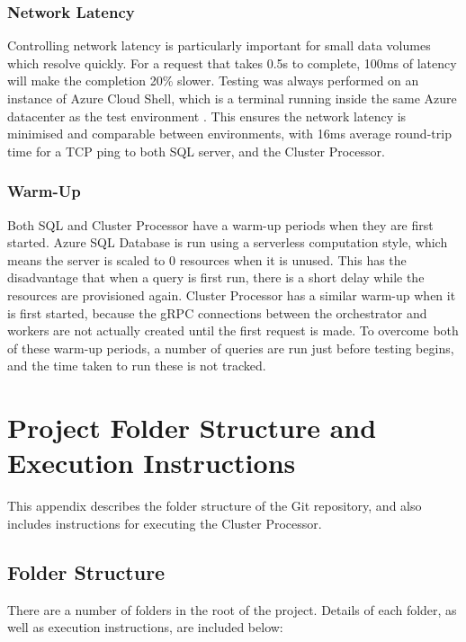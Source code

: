 \subsection{Network Latency}
Controlling network latency is particularly important for small data volumes which resolve quickly. For a request that takes 0.5s to complete, 100ms of latency will make the completion 20\% slower. Testing was always performed on an instance of Azure Cloud Shell, which is a terminal running inside the same Azure datacenter as the test environment \cite{azurecloudshell}. This ensures the network latency is minimised and comparable between environments, with 16ms average round-trip time for a TCP ping to both SQL server, and the Cluster Processor.

\subsection{Warm-Up}
Both SQL and Cluster Processor have a warm-up periods when they are first started. Azure SQL Database is run using a serverless computation style, which means the server is scaled to 0 resources when it is unused. This has the disadvantage that when a query is first run, there is a short delay while the resources are provisioned again. Cluster Processor has a similar warm-up when it is first started, because the gRPC connections between the orchestrator and workers are not actually created until the first request is made. To overcome both of these warm-up periods, a number of queries are run just before testing begins, and the time taken to run these is not tracked.

\chapter{Project Folder Structure and Execution Instructions}

This appendix describes the folder structure of the Git repository, and also includes instructions for executing the Cluster Processor.

\section{Folder Structure}
There are a number of folders in the root of the project. Details of each folder, as well as execution instructions, are included below:

